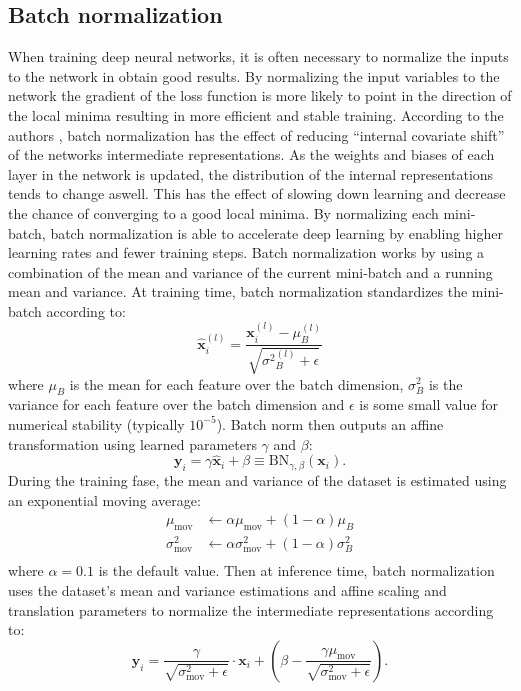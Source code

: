 \documentclass[a4paper,11pt]{article} %
\begin{document}
\subsection{Batch normalization}
When training deep neural networks, it is often necessary to normalize the inputs to the network in obtain good results. By normalizing the input variables to the network the gradient of the loss function is more likely to point in the direction of the local minima resulting in more efficient and stable training. According to the authors \cite{ioffe2015batch}, batch normalization has the effect of reducing ``internal covariate shift'' of the networks intermediate representations. As the weights and biases of each layer in the network is updated, the distribution of the internal representations tends to change aswell. This has the effect of slowing down learning and decrease the chance of converging to a good local minima. By normalizing each mini-batch, batch normalization is able to accelerate deep learning by enabling higher learning rates and fewer training steps. Batch normalization works by using a combination of the mean and variance of the current mini-batch and a running mean and variance. At training time, batch normalization standardizes the mini-batch according to:
\begin{equation}
  \hat{\mathbf{x}}_{i}^{(l)} = \frac{\mathbf{x}^{(l)}_{i}-\mu^{(l)}_{B}}{\sqrt{{\sigma^{2}}^{(l)}_{B}+\epsilon}}
\end{equation}
where $\mu_{B}$ is the mean for each feature over the batch dimension, $\sigma_{B}^{2}$ is the variance for each feature over the batch dimension and $\epsilon$ is some small value for numerical stability (typically $10^{-5}$). Batch norm then outputs an affine transformation using learned parameters $\gamma$ and $\beta$:
\begin{equation}
  \mathbf{y}_{i} = \gamma \hat{\mathbf{x}}_{i}+\beta \equiv \mathrm{BN}_{\gamma, \beta}\left(\mathbf{x}_{i}\right).
\end{equation}
During the training fase, the mean and variance of the dataset is estimated using an exponential moving average:
\begin{equation}
  \begin{split}
    \mu_\text{mov} &\leftarrow \alpha \mu_\text{mov} + (1 - \alpha)\mu_{B} \\
    \sigma^2_\text{mov} &\leftarrow \alpha \sigma^2_\text{mov} + (1 - \alpha)\sigma^2_{B} \\
  \end{split}
\end{equation}
where $\alpha=0.1$ is the default value. Then at inference time, batch normalization uses the dataset's mean and variance estimations and affine scaling and translation parameters to normalize the intermediate representations according to:
\begin{equation} \label{eq:batch-norm}
  \mathbf{y}_i = \frac{\gamma}{\sqrt{\sigma^{2}_\text{mov} +\epsilon}} \cdot \mathbf{x}_i +\left(\beta - \frac{\gamma \mu_\text{mov}}{\sqrt{\sigma^{2}_\text{mov}+\epsilon}}\right).
\end{equation}
\end{document}
